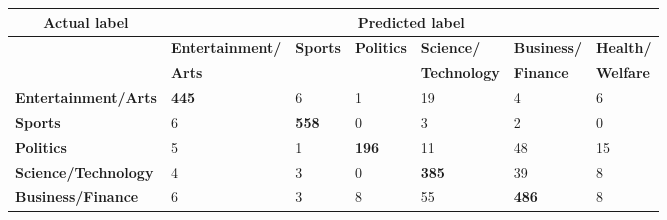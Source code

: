 \documentclass{l4proj}
\begin{document}
\begin{table}[]
\begin{tabular}{lllllll}
\hline
\multicolumn{1}{c}{\textbf{Actual label}} & \multicolumn{6}{c}{\textbf{Predicted label}}                                                                                                                                                                                            \\ \hline
                                          & \textbf{Entertainment/}              & \textbf{Sports}                      & \textbf{Politics}                    & \textbf{Science/}                    & \textbf{Business/}                   & \textbf{Health/}                     \\
                                          & \textbf{Arts}                        & \textbf{}                            & \textbf{}                            & \textbf{Technology}                  & \textbf{Finance}                     & \textbf{Welfare}                     \\ \hline
\textbf{Entertainment/Arts}               & \cellcolor[HTML]{67FD9A}\textbf{445} & \cellcolor[HTML]{FFCCC9}6            & \cellcolor[HTML]{FFCCC9}1            & \cellcolor[HTML]{FD6864}19           & \cellcolor[HTML]{FFCCC9}4            & \cellcolor[HTML]{FFCCC9}6            \\
\textbf{Sports}                           & \cellcolor[HTML]{FFCCC9}6            & \cellcolor[HTML]{67FD9A}\textbf{558} & 0                                    & \cellcolor[HTML]{FFCCC9}3            & \cellcolor[HTML]{FFCCC9}2             & 0                                    \\
\textbf{Politics}                         & \cellcolor[HTML]{FFCCC9}5            & \cellcolor[HTML]{FFCCC9}1            & \cellcolor[HTML]{67FD9A}\textbf{196} & \cellcolor[HTML]{FD6864}11           & \cellcolor[HTML]{FE0000}48           & \cellcolor[HTML]{FD6864}15           \\
\textbf{Science/Technology}               & \cellcolor[HTML]{FFCCC9}4            & \cellcolor[HTML]{FFCCC9}3            & 0                                    & \cellcolor[HTML]{67FD9A}\textbf{385} & \cellcolor[HTML]{FE0000}39           & \cellcolor[HTML]{FFCCC9}8            \\
\textbf{Business/Finance}                 & \cellcolor[HTML]{FFCCC9}6            & \cellcolor[HTML]{FFCCC9}3            & \cellcolor[HTML]{FFCCC9}8            & \cellcolor[HTML]{FE0000}55           & \cellcolor[HTML]{67FD9A}\textbf{486} & \cellcolor[HTML]{FFCCC9}8            \\

\end{tabular}
\end{table}
\end{document}
